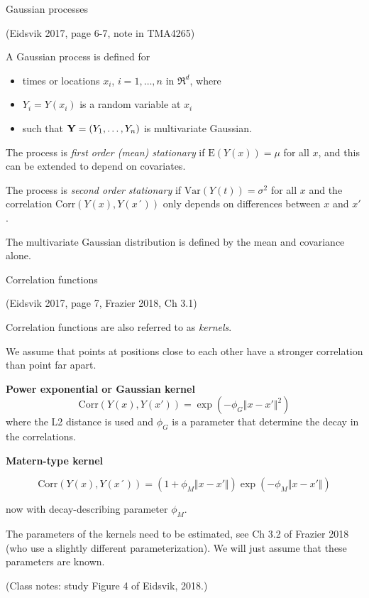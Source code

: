 \documentclass[
  ignorenonframetext,
]{beamer}
\providecommand{\tightlist}{%
  \setlength{\itemsep}{0pt}\setlength{\parskip}{0pt}}
\begin{document}
\begin{frame}

\begin{block}{Gaussian processes}

(Eidsvik 2017, page 6-7, note in TMA4265)

A Gaussian process is defined for

\begin{itemize}
\tightlist
\item
  times or locations \(x_i\), \(i=1,\ldots,n\) in \(\Re^d\), where
\item
  \(Y_i=Y(x_i)\) is a random variable at \(x_i\)
\item
  such that \({\bf Y}=(Y_1,\ldots,Y_n)\) is multivariate Gaussian.
\end{itemize}

The process is \emph{first order (mean) stationary} if
\(\text{E}(Y(x))=\mu\) for all \(x\), and this can be extended to depend
on covariates.

The process is \emph{second order stationary} if
\(\text{Var}(Y(t))=\sigma^2\) for all \(x\) and the correlation
\(\text{Corr}(Y(x),Y(x´))\) only depends on differences between \(x\)
and \(x'\).

The multivariate Gaussian distribution is defined by the mean and
covariance alone.

\end{block}

\end{frame}

\begin{frame}

\begin{block}{Correlation functions}

(Eidsvik 2017, page 7, Frazier 2018, Ch 3.1)

Correlation functions are also referred to as \emph{kernels}.

We assume that points at positions close to each other have a stronger
correlation than point far apart.

\textbf{Power exponential or Gaussian kernel}
\[ \text{Corr}(Y(x),Y(x'))=\exp(-\phi_G \Vert x-x' \Vert ^2)\] where the
L2 distance is used and \(\phi_G\) is a parameter that determine the
decay in the correlations.

\end{block}

\end{frame}

\begin{frame}

\textbf{Matern-type kernel}

\[\text{Corr}(Y(x),Y(x´))=(1+\phi_M \Vert x - x' \Vert)\exp(-\phi_M \Vert x - x' \Vert)\]

now with decay-describing parameter \(\phi_M\).

The parameters of the kernels need to be estimated, see Ch 3.2 of
Frazier 2018 (who use a slightly different parameterization). We will
just assume that these parameters are known.

(Class notes: study Figure 4 of Eidsvik, 2018.)

\end{frame}
\end{document}

